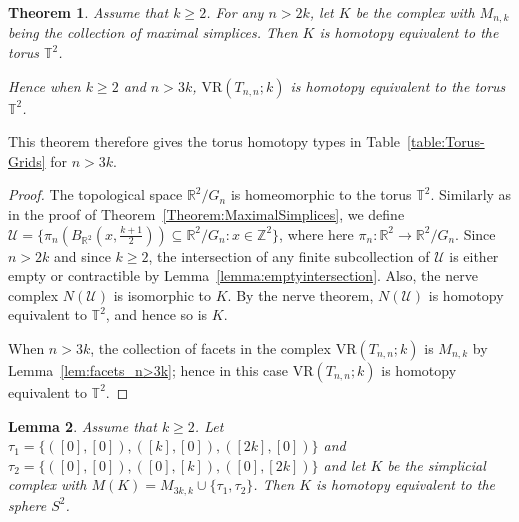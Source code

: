 \documentclass[12pt,a4paper]{amsart}
\newtheorem{theorem}{Theorem}[section]
\newtheorem{lemma}[theorem]{Lemma}
\theoremstyle{definition}
\newcommand{\R}{\ensuremath{\mathbb{R}}}
\newcommand{\T}{\ensuremath{\mathbb{T}}}
\newcommand{\Z}{\ensuremath{\mathbb{Z}}}
\newcommand{\cU}{\ensuremath{\mathcal{U}}}
\newcommand{\vr}[2]{\mathrm{VR}(#1;#2)}
\numberwithin{equation}{section}
\begin{document}
\begin{theorem}
\label{thm:torus_homotopy}
Assume that $k\geq 2$.
For any $n> 2k$, let $K$ be the complex with $M_{n, k}$ being the collection of maximal simplices.
Then $K$ is homotopy equivalent to the torus $\T^2$.

Hence when $k\ge 2$ and $n>3k$, $\vr{T_{n, n}}{k}$ is homotopy equivalent to the torus $\T^2$.
\end{theorem}

This theorem therefore gives the torus homotopy types in Table~\ref{table:Torus-Grids} for $n>3k$.

\begin{proof}
The topological space $\R^2/G_n$ is homeomorphic to the torus $\T^2$.
Similarly as in the proof of Theorem~\ref{Theorem:MaximalSimplices}, we define $\cU= \{\pi_n(B_{\R^2}(x,\frac{k+1}{2}))\subseteq \R^2/G_n : x\in\Z^2\}$, where here $\pi_n \colon \R^2 \to \R^2/G_n$.
Since $n>2k$ and since $k\geq 2$, the intersection of any finite subcollection of $\cU$ is either empty or contractible by Lemma~\ref{lemma:emptyintersection}.
Also, the nerve complex $N(\cU)$ is isomorphic to $K$.
By the nerve theorem, $N(\cU)$ is homotopy equivalent to $\T^2$, and hence so is $K$.

When $n>3k$, the collection of facets in the complex $\vr{T_{n, n}}{k}$ is $M_{n, k} $ by Lemma~\ref{lem:facets_n>3k}; hence in this case $\vr{T_{n, n}}{k}$ is homotopy equivalent to $\T^2$.
\end{proof}

\begin{lemma}
\label{lemma:subcomplex_3k}
Assume that $k\geq 2$.
Let $\tau_1=\{([0], [0]), ([k], [0]), ([2k], [0]) \}$ and $\tau_2=\{([0], [0]), ([0], [k]), ([0], [2k])\}$ and let $K$ be the simplicial complex with $M(K) = M_{3k,k}\cup \{\tau_1, \tau_2\}$.
Then $K$ is homotopy equivalent to the sphere $S^2$.
\end{lemma}
\end{document}
